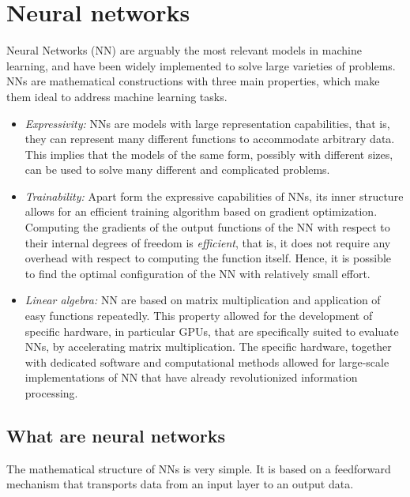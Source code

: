 \documentclass[]{report}
\begin{document}
\section{Neural networks}\label{sec.neural-networks}

Neural Networks (NN) are arguably the most relevant models in machine learning, and have been widely implemented to solve large varieties of problems. NNs are mathematical constructions with three main properties, which make them ideal to address machine learning tasks.

\begin{itemize}
\item \textit{Expressivity:} NNs are models with large representation capabilities, that is, they can represent many different functions to accommodate arbitrary data. This implies that the models of the same form, possibly with different sizes, can be used to solve many different and complicated problems. 
\item \textit{Trainability:} Apart form the expressive capabilities of NNs, its inner structure allows for an efficient training algorithm based on gradient optimization. Computing the gradients of the output functions of the NN with respect to their internal degrees of freedom is \textit{efficient}, that is, it does not require any overhead with respect to computing the function itself. Hence, it is possible to find the optimal configuration of the NN with relatively small effort. 
\item \textit{Linear algebra:} NN are based on matrix multiplication and application of easy functions repeatedly. This property allowed for the development of specific hardware, in particular GPUs, that are specifically suited to evaluate NNs, by accelerating matrix multiplication. The specific hardware, together with dedicated software and computational methods allowed for large-scale implementations of NN that have already revolutionized information processing. 
\end{itemize}

\subsection{What are neural networks}\label{sec.what-neural-networks}
The mathematical structure of NNs is very simple. It is based on a feedforward mechanism that transports data from an input layer to an output data. 
\end{document}
